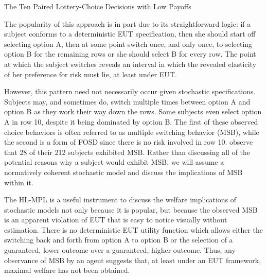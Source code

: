\documentclass[../main.tex]{subfiles}
\begin{document}
\begin{table}[ht]
	\centering
	\captionsetup{justification=centering}
	\caption{The Ten Paired Lottery-Choice Decisions with Low Payoffs \newline \textcite[1645]{Holt2002} }
	\label{tb:HL-MPL}
	\begin{adjustbox}{width=1\textwidth}
	\end{adjustbox}
\end{table}

The popularity of this approach is in part due to its straightforward logic:
if a subject conforms to a deterministic EUT specification, then she should start off selecting option A, then at some point switch once, and only once, to selecting option B for the remaining rows or she should select B for every row.
The point at which the subject switches reveals an interval in which the revealed elasticity of her preference for risk must lie, at least under EUT.

However, this pattern need not necessarily occur given stochastic specifications.
Subjects may, and sometimes do, switch multiple times between option A and option B as they work their way down the rows.
Some subjects even select option A in row 10, despite it being dominated by option B.
The first of these observed choice behaviors is often referred to as multiple switching behavior (MSB), while the second is a form of FOSD since there is no risk involved in row 10.
\textcite[1647]{Holt2002} observe that 28 of their 212 subjects exhibited MSB.
Rather than discussing all of the potential reasons why a subject would exhibit MSB, we will assume a normatively coherent stochastic model and discuss the implications of MSB within it.

The HL-MPL is a useful instrument to discuss the welfare implications of stochastic models not only because it is popular, but because the observed MSB is an apparent violation of EUT that is easy to notice visually without estimation.
There is no deterministic EUT utility function which allows either the switching back and forth from option A to option B or the selection of a guaranteed, lower outcome over a guaranteed, higher outcome.
Thus, any observance of MSB by an agent suggests that, at least under an EUT framework, maximal welfare has not been obtained.
\end{document}
